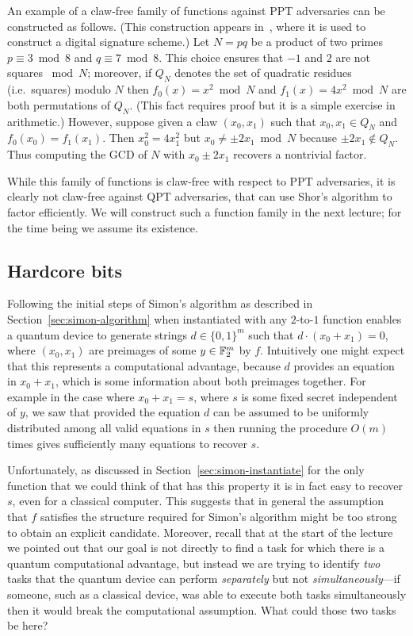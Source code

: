 An example of a claw-free family of functions against PPT adversaries can be constructed as follows. (This construction appears in~\cite{goldwasser1985paradoxical}, where it is used to construct a digital signature scheme.) Let $N=pq$ be a product of two primes $p\equiv 3 \bmod 8 $ and $q\equiv 7 \bmod 8$. This choice ensures that $-1$ and $2$ are not squares $\bmod N$; moreover, if $Q_N$ denotes the set of quadratic residues (i.e.\ squares) modulo $N$ then $f_0(x)=x^2 \bmod N$ and $f_1(x)=4x^2 \bmod N$ are both permutations of $Q_N$. (This fact requires proof but it is a simple exercise in arithmetic.) However, suppose given a claw $(x_0,x_1)$ such that $x_0,x_1\in Q_N$ and $f_0(x_0)=f_1(x_1)$. Then $x_0^2 = 4 x_1^2$ but $x_0 \neq \pm 2x_1 \bmod N$ because $\pm 2x_1\notin Q_N$. Thus computing the GCD of $N$ with $x_0\pm 2x_1$ recovers a nontrivial factor. 

While this family of functions is claw-free with respect to PPT adversaries, it is clearly not claw-free against QPT adversaries, that can use Shor's algorithm to factor efficiently. We will construct such a function family in the next lecture; for the time being we assume its existence. 


\subsection{Hardcore bits}

Following the initial steps of Simon's algorithm as described in Section~\ref{sec:simon-algorithm} when instantiated with any $2$-to-$1$ function enables a quantum device to generate strings $d\in\{0,1\}^m$ such that $d\cdot (x_0 + x_1) = 0$, where $(x_0,x_1)$ are preimages of some $y\in \mathbb{F}_2^m$ by $f$. Intuitively one might expect that this represents a computational advantage, because $d$ provides an equation in $x_0+x_1$, which is some information about both preimages together. For example in the case where $x_0+ x_1 = s$, where $s$ is some fixed secret independent of $y$, we saw that provided the equation $d$ can be assumed to be uniformly distributed among all valid equations in $s$ then running the procedure $O(m)$ times gives sufficiently many equations to recover $s$. 

Unfortunately, as discussed in Section~\ref{sec:simon-instantiate} for the only function that we could think of that has this property it is in fact easy to recover $s$, even for a classical computer. This suggests that in general the assumption that $f$ satisfies the structure required for Simon's algorithm might be too strong to obtain an explicit candidate. Moreover, recall that at the start of the lecture we pointed out that our goal is not directly to find a task for which there is a quantum computational advantage, but instead we are trying to identify \emph{two} tasks that the quantum device can perform \emph{separately} but not \emph{simultaneously}---if someone, such as a classical device, was able to execute both tasks simultaneously then it would break the computational assumption. What could those two tasks be here? 

